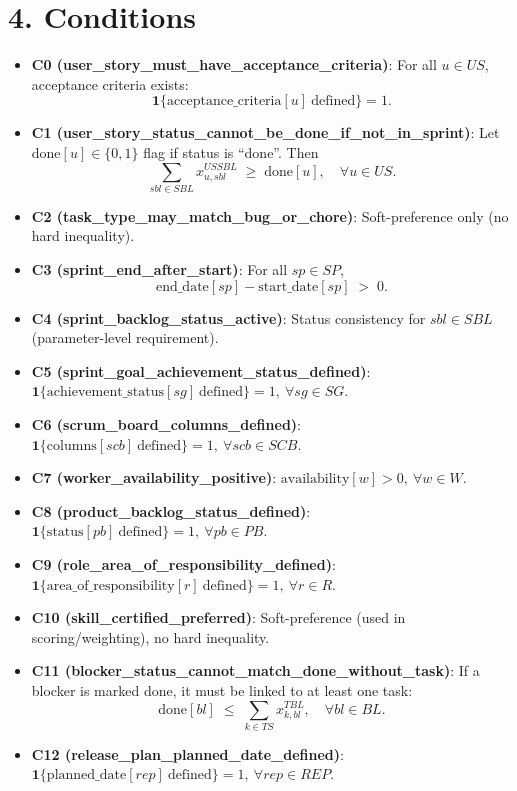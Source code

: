 \documentclass[11pt,a4paper]{article}
\begin{document}
\section{4. Conditions}
\begin{itemize}
  \item \textbf{C0 (user\_story\_must\_have\_acceptance\_criteria)}: For all $u\in US$, acceptance criteria exists:
  \[
    \mathbf{1}\{\text{acceptance\_criteria}[u]\ \text{defined}\}=1.
  \]
  \item \textbf{C1 (user\_story\_status\_cannot\_be\_done\_if\_not\_in\_sprint)}: Let $\text{done}[u]\in\{0,1\}$ flag if status is ``done''. Then
  \[
    \sum_{sbl\in SBL} x^{US\!SBL}_{u,sbl} \;\ge\; \text{done}[u],\quad \forall u\in US.
  \]
  \item \textbf{C2 (task\_type\_may\_match\_bug\_or\_chore)}: Soft-preference only (no hard inequality).
  \item \textbf{C3 (sprint\_end\_after\_start)}: For all $sp\in SP$,
  \[
    \text{end\_date}[sp] - \text{start\_date}[sp] \;>\; 0.
  \]
  \item \textbf{C4 (sprint\_backlog\_status\_active)}: Status consistency for $sbl\in SBL$ (parameter-level requirement).
  \item \textbf{C5 (sprint\_goal\_achievement\_status\_defined)}: $\mathbf{1}\{\text{achievement\_status}[sg]\ \text{defined}\}=1,\ \forall sg\in SG$.
  \item \textbf{C6 (scrum\_board\_columns\_defined)}: $\mathbf{1}\{\text{columns}[scb]\ \text{defined}\}=1,\ \forall scb\in SCB$.
  \item \textbf{C7 (worker\_availability\_positive)}: $\text{availability}[w] > 0,\ \forall w\in W$.
  \item \textbf{C8 (product\_backlog\_status\_defined)}: $\mathbf{1}\{\text{status}[pb]\ \text{defined}\}=1,\ \forall pb\in PB$.
  \item \textbf{C9 (role\_area\_of\_responsibility\_defined)}: $\mathbf{1}\{\text{area\_of\_responsibility}[r]\ \text{defined}\}=1,\ \forall r\in R$.
  \item \textbf{C10 (skill\_certified\_preferred)}: Soft-preference (used in scoring/weighting), no hard inequality.
  \item \textbf{C11 (blocker\_status\_cannot\_match\_done\_without\_task)}: If a blocker is marked done, it must be linked to at least one task:
  \[
    \text{done}[bl] \;\le\; \sum_{k\in TS} x^{T\!BL}_{k,bl},\quad \forall bl\in BL.
  \]
  \item \textbf{C12 (release\_plan\_planned\_date\_defined)}: $\mathbf{1}\{\text{planned\_date}[rep]\ \text{defined}\}=1,\ \forall rep\in REP$.

\end{itemize}
\end{document}
